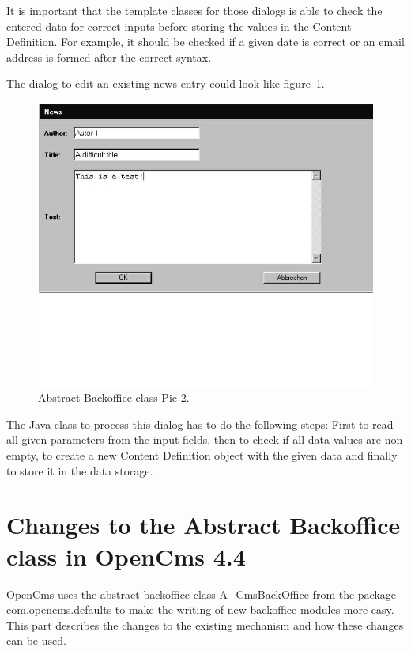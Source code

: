 It is important that the template classes for those dialogs is able to
check the entered data for correct inputs before storing the values in
the Content Definition. For example, it should be checked  if a given
date is correct or an email address is formed after the correct syntax.

The dialog to edit an existing news entry could look like figure~\ref{AbsrtactBO1}.

\begin{figure}
\begin{center}
\includegraphics[clip,width=\sgw]{pics/backOffice/new}
\end{center}
\caption[Abstract Backoffice class Pic 2]{Abstract Backoffice class Pic 2.}
\label{AbsrtactBO1}
\end{figure}

The Java class to process this dialog has to do the following steps:
First to read all given parameters from the input fields, then to check
if all data values are non empty,  to create a new Content Definition
object with the given data and finally to store it in the data storage.

\section{Changes to the Abstract Backoffice class in OpenCms 4.4}
OpenCms uses the abstract backoffice class {\name A\_CmsBackOffice} from the
package  \\
{\name com.opencms.defaults} to make the writing of new backoffice 
modules more easy. 
This part describes the changes to the existing mechanism and how these
changes can be used.

